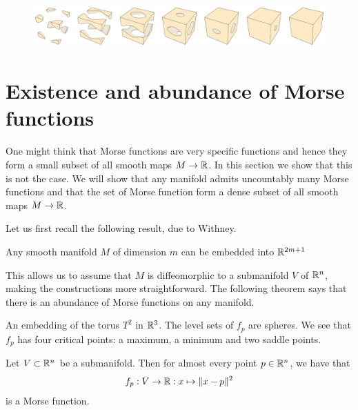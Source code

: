 \begin{eg}[$T^{3} = S^{1} \times S^{1} \times S^{2}$]
    \begin{figure}[H]
    \centering
    \includegraphics[width=0.90\paperwidth]{./notebooks/three-torus/output.png}
    \label{fig:three-torus-handle-decomposition}
\end{figure}
\end{eg}





\section{Existence and abundance of Morse functions}
One might think that Morse functions are very specific functions and hence they form a small subset of all smooth maps $M \to  \mathbb{R}$.
In this section we show that this is not the case. We will show that any manifold admits uncountably many Morse functions and that the set of Morse function form a dense subset of all smooth maps $M \to  \mathbb{R}$.

Let us first recall the following result, due to Withney.
\begin{theorem}
    Any smooth manifold $M$ of dimension $m$ can be embedded into  $\mathbb{R}^{2m+1}$
\end{theorem}
This allows us to assume that $M$ is diffeomorphic to a submanifold $V$ of $\mathbb{R}^{n}$, making the constructions  more straightforward.
The following theorem says that there is an abundance of Morse functions on any manifold.
\begin{marginfigure}
    \centering
    \caption{An embedding of the torus $T^2$ in $\mathbb{R}^3$. The level sets of $f_p$ are spheres. We see that $f_p$ has four critical points: a maximum, a minimum and two saddle points.}
    \label{fig:level-sets-of-distance-function-torus}
\end{marginfigure}
\begin{prop}
    Let $V \subset \mathbb{R}^{n}$ be a submanifold.
    Then for almost every point $p \in \mathbb{R}^{n}$, we have that
    \[
    f_p : V \to \mathbb{R}: x \mapsto  \|x - p\|^2
    \] 
    is a Morse function.
\end{prop}


